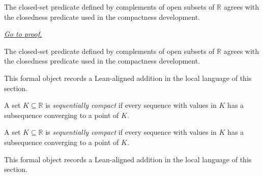 \begin{dependencies}
\NoLocalDependencies
\end{dependencies}
\begin{theorem}
\label{thm:is-closed-set-iff-is-closed-r}
The closed-set predicate defined by complements of open subsets of $\mathbb R$ agrees with the closedness predicate used in the compactness development.

\smallskip
\noindent
\hyperref[prf:is-closed-set-iff-is-closed-r]{\textit{Go to proof.}}
\end{theorem}

\begin{remark*}
The closed-set predicate defined by complements of open subsets of $\mathbb R$ agrees with the closedness predicate used in the compactness development.
\end{remark*}

\begin{remark*}[Interpretation]
This formal object records a Lean-aligned addition in the local language of this section.
\end{remark*}

\begin{dependencies}
\NoLocalDependencies
\end{dependencies}
\begin{definition}
\label{def:is-seq-compact-r}
A set $K\subseteq\mathbb R$ is \emph{sequentially compact} if every sequence with values in $K$ has a subsequence converging to a point of $K$.
\end{definition}

\begin{remark*}
A set $K\subseteq\mathbb R$ is \emph{sequentially compact} if every sequence with values in $K$ has a subsequence converging to a point of $K$.
\end{remark*}

\begin{remark*}[Interpretation]
This formal object records a Lean-aligned addition in the local language of this section.
\end{remark*}

